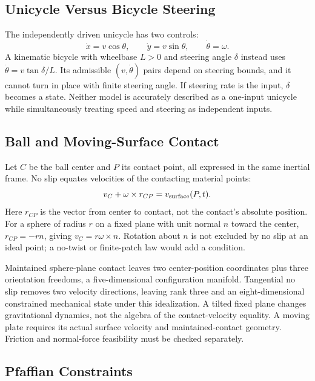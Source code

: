 \subsection{Unicycle Versus Bicycle Steering}

The independently driven unicycle has two controls:
\begin{equation}
 \dot x=v\cos\theta,\qquad \dot y=v\sin\theta,\qquad\dot\theta=\omega.
\end{equation}
A kinematic bicycle with wheelbase $L>0$ and steering angle $\delta$ instead uses $\dot\theta=v\tan\delta/L$. Its admissible $(v,\dot\theta)$ pairs depend on steering bounds, and it cannot turn in place with finite steering angle. If steering rate is the input, $\delta$ becomes a state. Neither model is accurately described as a one-input unicycle while simultaneously treating speed and steering as independent inputs.

\subsection{Ball and Moving-Surface Contact}

Let $C$ be the ball center and $P$ its contact point, all expressed in the same inertial frame. No slip equates velocities of the contacting material points:
\begin{equation}
 v_C+\omega\times r_{CP}=v_{\rm surface}(P,t).
\end{equation}
Here $r_{CP}$ is the vector from center to contact, not the contact's absolute position. For a sphere of radius $r$ on a fixed plane with unit normal $n$ toward the center, $r_{CP}=-rn$, giving $v_C=r\omega\times n$. Rotation about $n$ is not excluded by no slip at an ideal point; a no-twist or finite-patch law would add a condition.

Maintained sphere-plane contact leaves two center-position coordinates plus three orientation freedoms, a five-dimensional configuration manifold. Tangential no slip removes two velocity directions, leaving rank three and an eight-dimensional constrained mechanical state under this idealization. A tilted fixed plane changes gravitational dynamics, not the algebra of the contact-velocity equality. A moving plate requires its actual surface velocity and maintained-contact geometry. Friction and normal-force feasibility must be checked separately.

\subsection{Pfaffian Constraints}

